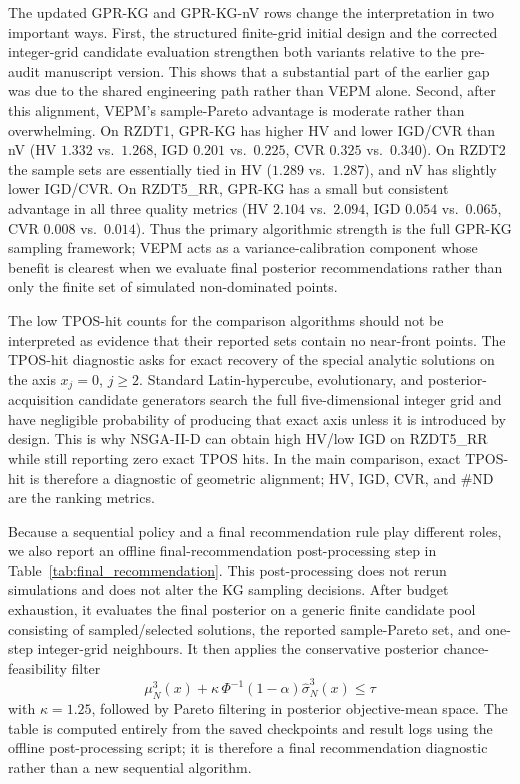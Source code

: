 \documentclass[12pt]{article}
\theoremstyle{plain}
\theoremstyle{definition}
\theoremstyle{remark}
\begin{document}
The updated GPR-KG and GPR-KG-nV rows change the interpretation in two
important ways.  First, the structured finite-grid initial design and
the corrected integer-grid candidate evaluation strengthen both
variants relative to the pre-audit manuscript version.  This shows that
a substantial part of the earlier gap was due to the shared
engineering path rather than VEPM alone.  Second, after this alignment,
VEPM's sample-Pareto advantage is moderate rather than overwhelming.
On RZDT1, GPR-KG has higher HV and lower IGD/CVR than nV
(HV $1.332$ vs.\ $1.268$, IGD $0.201$ vs.\ $0.225$, CVR $0.325$ vs.\
$0.340$).  On RZDT2 the sample sets are essentially tied in HV
($1.289$ vs.\ $1.287$), and nV has slightly lower IGD/CVR.  On
RZDT5\_RR, GPR-KG has a small but consistent advantage in all three
quality metrics (HV $2.104$ vs.\ $2.094$, IGD $0.054$ vs.\ $0.065$,
CVR $0.008$ vs.\ $0.014$).  Thus the primary algorithmic strength is
the full GPR-KG sampling framework; VEPM acts as a variance-calibration
component whose benefit is clearest when we evaluate final posterior
recommendations rather than only the finite set of simulated
non-dominated points.

The low TPOS-hit counts for the comparison algorithms should not be
interpreted as evidence that their reported sets contain no
near-front points.  The TPOS-hit diagnostic asks for exact recovery of
the special analytic solutions on the axis $x_j=0$, $j\ge2$.  Standard
Latin-hypercube, evolutionary, and posterior-acquisition candidate
generators search the full five-dimensional integer grid and have
negligible probability of producing that exact axis unless it is
introduced by design.  This is why NSGA-II-D can obtain high HV/low
IGD on RZDT5\_RR while still reporting zero exact TPOS hits.  In the
main comparison, exact TPOS-hit is therefore a diagnostic of geometric
alignment; HV, IGD, CVR, and $\#$ND are the ranking metrics.

Because a sequential policy and a final recommendation rule play
different roles, we also report an offline final-recommendation
post-processing step in Table~\ref{tab:final_recommendation}.  This
post-processing does not rerun simulations and does not alter the
KG sampling decisions.  After budget exhaustion, it evaluates the
final posterior on a generic finite candidate pool consisting of
sampled/selected solutions, the reported sample-Pareto set, and
one-step integer-grid neighbours.  It then applies the conservative
posterior chance-feasibility filter
\[
  \mu_N^3(x)+\kappa\,\Phi^{-1}(1-\alpha)\hat{\sigma}_N^3(x)\le \tau
\]
with $\kappa=1.25$, followed by Pareto filtering in posterior
objective-mean space.  The table is computed entirely from the saved
checkpoints and result logs using the offline post-processing script;
it is therefore a final recommendation diagnostic rather than a new
sequential algorithm.
\end{document}
